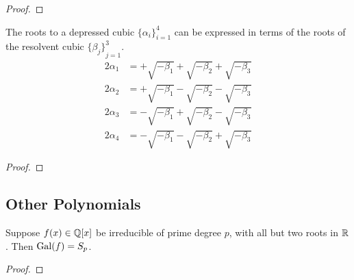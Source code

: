 \begin{proof}
\end{proof}
\begin{theorem}
    The roots to a depressed cubic \({\{\alpha_i\}}_{i=1}^4\)
    can be expressed in terms of the roots of the resolvent cubic \({\{\beta_j\}}_{j=1}^3\).
    \begin{align*}
        2\alpha_1 &= + \sqrt{-\beta_1} + \sqrt{-\beta_2} + \sqrt{-\beta_3} \\
        2\alpha_2 &= + \sqrt{-\beta_1} - \sqrt{-\beta_2} - \sqrt{-\beta_3} \\
        2\alpha_3 &= -\sqrt{-\beta_1} + \sqrt{-\beta_2} - \sqrt{-\beta_3} \\
        2\alpha_4 &= -\sqrt{-\beta_1} - \sqrt{-\beta_2} + \sqrt{-\beta_3}
    \end{align*}
\end{theorem}
\begin{proof}
\end{proof}

\subsection*{Other Polynomials}

\begin{theorem}
    Suppose \(f(x) \in \mathbb{Q}[x]\) be irreducible of prime degree \(p\),
    with all but two roots in \(\mathbb{R}\).
    Then \(\operatorname{Gal}(f) = S_p\).
\end{theorem}
\begin{proof}
\end{proof}

